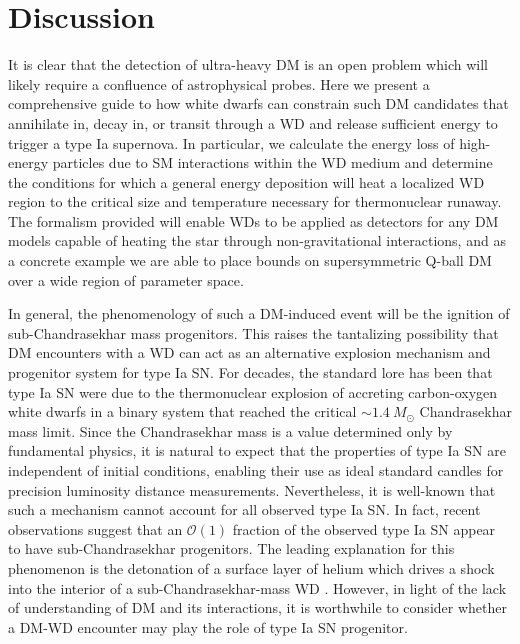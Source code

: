 \documentclass[twocolumn, preprintnumbers,amsmath,amssymb,prd, superscriptaddress]{revtex4}
\newcommand{\OO}{\mathcal{O}}
\begin{document}
\section{Discussion}
\label{sec:Discussion}

It is clear that the detection of ultra-heavy DM is an open problem which will likely require a confluence of astrophysical probes.
Here we present a comprehensive guide to how white dwarfs can constrain such DM candidates that annihilate in, decay in, or transit through a WD and release sufficient energy to trigger a type Ia supernova.
In particular, we calculate the energy loss of high-energy particles due to SM interactions within the WD medium and determine the conditions for which a general energy deposition will heat a localized WD region to the critical size and temperature necessary for thermonuclear runaway.
The formalism provided will enable WDs to be applied as detectors for any DM models capable of heating the star through non-gravitational interactions, and as a concrete example we are able to place bounds on supersymmetric Q-ball DM over a wide region of parameter space.

In general, the phenomenology of such a DM-induced event will be the ignition of sub-Chandrasekhar mass progenitors.
This raises the tantalizing possibility that DM encounters with a WD can act as an alternative explosion mechanism and progenitor system for type Ia SN.
For decades, the standard lore has been that type Ia SN were due to the thermonuclear explosion of accreting carbon-oxygen white dwarfs in a binary system that reached the critical $\sim 1.4 ~M_{\odot}$ Chandrasekhar mass limit.
Since the Chandrasekhar mass is a value determined only by fundamental physics, it is natural to expect that the properties of type Ia SN are independent of initial conditions, enabling their use as ideal standard candles for precision luminosity distance measurements.
Nevertheless, it is well-known that such a mechanism cannot account for all observed type Ia SN.
In fact, recent observations \cite{Scalzo:2014sap, Scalzo:2014wxa} suggest that an $\OO(1)$ fraction of the observed type Ia SN appear to have sub-Chandrasekhar progenitors.
The leading explanation for this phenomenon is the detonation of a surface layer of helium which drives a shock into the interior of a sub-Chandrasekhar-mass WD \cite{Woosley1994,Fink:2007fv}.
However, in light of the lack of understanding of DM and its interactions, it is worthwhile to consider whether a DM-WD encounter may play the role of type Ia SN progenitor.
\end{document}
